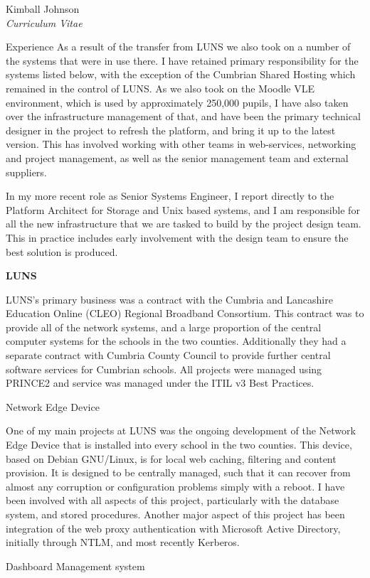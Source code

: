 \documentclass[10pt]{article}
\newenvironment{subbulletlist}{%
	\begin{list}{\labelitemii}{%
		\setlength{\topsep}{\itemsep}\setlength{\parskip}{\parsep}%
	}%
}%
{ \end{list} }
\begin{document}
\begin{cv}{Kimball Johnson\\{\large \itshape Curriculum Vitae}}
\begin{cvlist}{Experience}
    As a result of the transfer from LUNS we also took on a number of the
systems that were in use there.  I have retained primary responsibility for the
systems listed below, with the exception of the Cumbrian Shared Hosting which
 remained in the control of LUNS.  As we also took on the Moodle VLE
environment, which is used by approximately 250,000 pupils, I have also taken
over the infrastructure management of that, and have been the primary technical
designer in the project to refresh the platform, and bring it up to the latest
version.  This has involved working with other teams in web-services,
networking and project management, as well as the senior management team and
external suppliers.  
     
    In my more recent role as Senior Systems Engineer, I report directly to
the Platform Architect for Storage and Unix based systems, and I am responsible
for all the new infrastructure that we are tasked to build by the project
design team.  This in practice includes early involvement with the design team
to ensure the best solution is produced.
	
	\item \textbf{LUNS}

    LUNS's primary business was a contract with the Cumbria and Lancashire
    Education Online (CLEO) Regional Broadband Consortium.  This contract was
    to provide all of the network systems, and a large proportion of the
    central computer systems for the schools in the two counties.
    Additionally they had a separate contract with Cumbria County Council to
    provide further central software services for Cumbrian schools. All projects 
	were managed using PRINCE2 and service was managed under the ITIL v3 Best Practices.
	\begin{subbulletlist}
    \item Network Edge Device

        One of my main projects at LUNS was the ongoing development of the
        Network Edge Device that is installed into every school in the two
        counties.  This device, based on Debian GNU/Linux, is for local 
        web caching, filtering and content provision.  It is designed to 
        be centrally managed, such that it can recover from almost any
        corruption or configuration problems simply with a reboot. I have 
        been involved with all aspects of this project, particularly with the 
        database system, and stored procedures. Another major aspect of this 
        project has been integration of the web proxy authentication with
        Microsoft Active Directory, initially through NTLM, and most recently
        Kerberos. 
    \item Dashboard Management system


\end{subbulletlist}
\end{cvlist}
\end{cv}
\end{document}
